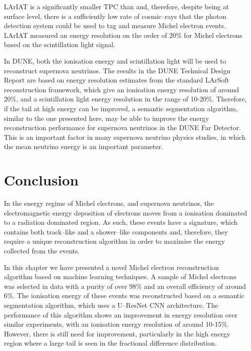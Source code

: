 LArIAT is a significantly smaller TPC than \protodune{} and, therefore, despite
being at surface level, there is a sufficiently low rate of cosmic--rays that the
photon detection system could be used to tag and measure Michel electron events.
LArIAT measured an energy resolution on the order of 20\% for Michel electrons
based on the scintillation light signal\cite{Foreman_2016}.

In DUNE, both the ionisation energy and scintillation light will be used to
reconstruct supernova neutrinos. The results in the DUNE Technical Design
Report are based on energy resolution estimates from the standard
LArSoft reconstruction framework, which give an ionisation energy resolution of
around 20\%, and a scintillation light energy resolution in the range of
10-20\%\cite{Abi:2020evt}. Therefore, if the tail at high energy can be
improved, a semantic segmentation algorithm, similar to the one presented
here, may be able to improve the energy reconstruction performance for
supernova neutrinos in the DUNE Far Detector. This is an important factor in
many supernova neutrino physics studies, in which the mean neutrino energy is an
important parameter\cite{Abi:2020evt}.

\section{Conclusion} \label{ME_EU}

In the energy regime of Michel electrons, and supernova neutrinos, the
electromagnetic energy deposition of electrons moves from a ionisation dominated
to a radiation dominated region. As such, these events have a signature, which
contains both track--like and a shower--like components and, therefore, they
require a unique reconstruction algorithm in order to maximise the energy
collected from the events.

In this chapter we have presented a novel Michel electron reconstruction
algorithm based on machine learning techniques. A sample of Michel electrons was
selected in \protodune{} data with a purity of over 98\% and an overall
efficiency of around 6\%. The ionisation energy of these events was
reconstructed based on a semantic segmentation algorithm, which uses a U--ResNet
CNN architecture. The performance of this algorithm shows an improvement in
energy resolution over similar experiments, with an ionisation energy resolution
of around 10-15\%. However, there is still need for improvement, particularly
in the high energy region where a large tail is seen in the fractional
difference distribution.

